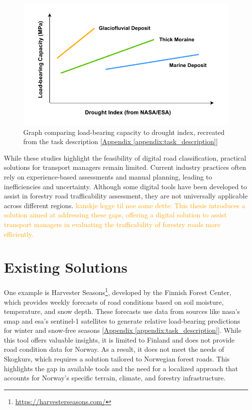 \begin{figure}[h]
    \centering
    \includegraphics[width=0.7\linewidth]{figures/bæreevne_tørkeindex.pdf}
    \caption[Graph comparing load-bearing capacity to drought index]{Graph comparing load-bearing capacity to drought index, recreated from the task description [\hyperref[appendix:task_description]{Appendix \ref*{appendix:task_description}}]}
    \label{fig:load_to_drought_graph}
\end{figure}

While these studies highlight the feasibility of digital road classification, practical solutions for transport managers remain limited. Current industry practices often rely on experience-based assessments and manual planning, leading to inefficiencies and uncertainty. Although some digital tools have been developed to assist in forestry road trafficability assessment, they are not universally applicable across different regions. \textcolor{orange}{kanskje legge til noe some dette: This thesis introduces a solution aimed at addressing these gaps, offering a digital solution to assist transport managers in evaluating the trafficability of forestry roads more efficiently.}

\section{Existing Solutions}

One example is Harvester Seasons\footnote{\url{https://harvesterseasons.com/}}, developed by the Finnish Forest Center, which provides weekly forecasts of road conditions based on soil moisture, temperature, and snow depth. These forecasts use data from sources like \acrshort{nasa}'s \gls{smap} and \acrshort{esa}'s \Gls{sentinel-1} satellites to generate relative load-bearing predictions for winter and snow-free seasons [\hyperref[appendix:task_description]{Appendix \ref*{appendix:task_description}}]. While this tool offers valuable insights, it is limited to Finland and does not provide road condition data for Norway. As a result, it does not meet the needs of Skogkurs, which requires a solution tailored to Norwegian forest roads. This highlights the gap in available tools and the need for a localized approach that accounts for Norway’s specific terrain, climate, and forestry infrastructure.

